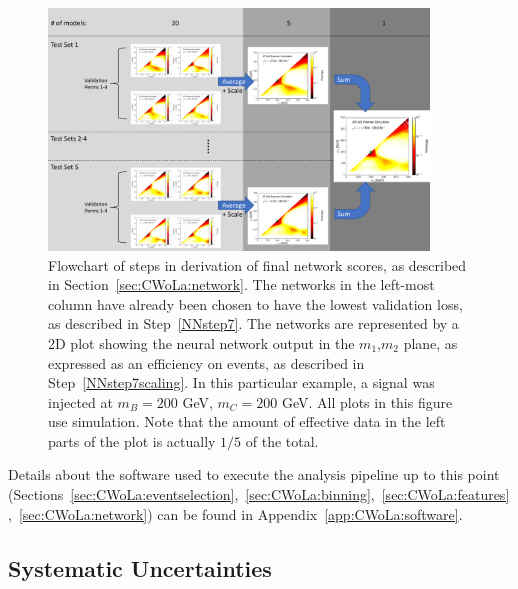\begin{figure}[t!]
    \centering
    \includegraphics[width=0.9\textwidth]{figures_CWoLa/split_flowchart.pdf}
    \caption{Flowchart of steps in derivation of final network scores, as described in Section~\ref{sec:CWoLa:network}. The networks in the left-most column have already been chosen to have the lowest validation loss, as described in Step~\ref{NNstep7}. The networks are represented by a 2D plot showing the neural network output in the $m_1$,$m_2$ plane, as expressed as an efficiency on events, as described in Step~\ref{NNstep7scaling}. In this particular example, a signal was injected at $m_B=200$ GeV, $m_C=200$ GeV.  All plots in this figure use simulation.  Note that the amount of effective data in the left parts of the plot is actually $1/5$ of the total.}
    \label{fig:CWoLa:flowchart}
\end{figure}


Details about the software used to execute the analysis pipeline up to this point (Sections~\ref{sec:CWoLa:eventselection},~\ref{sec:CWoLa:binning},~\ref{sec:CWoLa:features},~\ref{sec:CWoLa:network}) can be found in Appendix~\ref{app:CWoLa:software}.

\clearpage
\subsection{Systematic Uncertainties}
\label{sec:CWoLa:systs}

